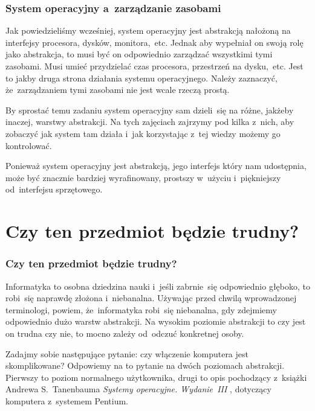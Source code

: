 \documentclass[10pt,t]{beamer}
\begin{document}





\begin{frame}
  \frametitle{System operacyjny a~zarządzanie zasobami}


  Jak powiedzieliśmy wcześniej, system operacyjny jest abstrakcją nałożoną
  na interfejsy procesora, dysków, monitora,~etc. Jednak aby wypełniał
  on swoją rolę jako abstrakcja, to musi być on odpowiednio
  \alert{zarządzać} wszystkimi tymi zasobami. Musi umieć przydzielać czas
  procesora, przestrzeń na dysku,~etc. Jest to jakby druga strona działania
  systemu operacyjnego. Należy zaznaczyć, że~zarządzaniem tymi zasobami nie
  jest wcale rzeczą prostą.

  By sprostać temu zadaniu system operacyjny sam dzieli~się na różne,
  jakżeby inaczej, warstwy abstrakcji. Na tych zajęciach zajrzymy pod kilka
  z~nich, aby zobaczyć jak system tam działa i~jak korzystając z~tej wiedzy
  możemy go kontrolować.

  Ponieważ system operacyjny jest abstrakcją, jego interfejs który
  nam udostępnia, może być znacznie bardziej wyrafinowany, prostszy
  w~użyciu i~piękniejszy od~interfejsu sprzętowego.

\end{frame}










\section{Czy ten przedmiot będzie trudny?}



\begin{frame}
  \frametitle{Czy ten przedmiot będzie trudny?}


  Informatyka to osobna dziedzina nauki i~jeśli zabrnie~się odpowiednio
  głęboko, to robi~się naprawdę złożona i~niebanalna. Używając przed chwilą
  wprowadzonej terminologi, powiem, że~informatyka robi~się niebanalna, gdy
  zdejmiemy odpowiednio dużo warstw abstrakcji. Na wysokim poziomie
  abstrakcji to czy jest on trudna czy nie, to mocno zależy od~odczuć
  konkretnej osoby.

  Zadajmy sobie następujące pytanie: czy włączenie komputera jest
  skomplikowane? Odpowiemy na to pytanie na dwóch poziomach abstrakcji.
  Pierwszy to poziom normalnego użytkownika, drugi to opis pochodzący
  z~książki Andrewa S.~Tanenbauma \textit{Systemy operacyjne. Wydanie~III}
  \parencite{Tanenbaum-Systemy-operacyjne-Wydanie-III-Pub-2013}, dotyczący
  komputera z~systemem Pentium.

\end{frame}
\end{document}
